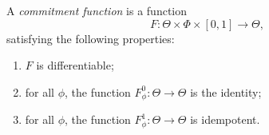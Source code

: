 \documentclass{article}
\begin{document}
\begin{defn}
    A \emph{commitment function} is a function
    \[
        F: \Theta \times \Phi \times [0,1] \to \Theta,
    \]
    satisfying the following properties:
    \begin{enumerate}[nosep,label={CF\arabic*.}]
        \item $F$ is differentiable;
        \item for all $\phi$, the function $F^0_\phi : \Theta \to \Theta$ is the identity;
        \item for all $\phi$, the function $F^1_\phi : \Theta \to \Theta$ is idempotent.
    \end{enumerate}
\end{defn}
\end{document}
